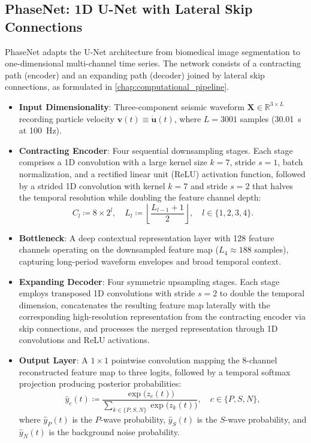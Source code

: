 \subsection{\ac{PhaseNet}: 1D U-Net with Lateral Skip Connections}
\label{subsec:phasenet_arch}

\ac{PhaseNet} adapts the U-Net architecture from biomedical image
segmentation to
one-dimensional multi-channel time series. The network consists of a
contracting
path (encoder) and an expanding path (decoder) joined by lateral
skip connections,
as formulated in \cref{chap:computational_pipeline}.

\begin{itemize}
  \item \textbf{Input Dimensionality}: Three-component seismic waveform
    $\mathbf{X} \in \mathbb{R}^{3 \times L}$ recording particle velocity
    $\mathbf{v}(t) \equiv \dot{\mathbf{u}}(t)$, where $L = \num{3001}$ samples
    (\qty{30.01}{\second} at \qty{100}{\hertz}).
  \item \textbf{Contracting Encoder}: Four sequential downsampling stages.
    Each stage comprises a 1D convolution with a large kernel size
    $k = \num{7}$,
    stride $s = \num{1}$, batch normalization, and a rectified
    linear unit (ReLU)
    activation function, followed by a strided 1D convolution with
    kernel $k = \num{7}$
    and stride $s = \num{2}$ that halves the temporal resolution
    while doubling the
    feature channel depth:
    \begin{equation}
      C_l \coloneqq \num{8} \times 2^l, \quad L_l \coloneqq
      \left\lfloor \frac{L_{l-1} +
      1}{2} \right\rfloor, \quad l \in \{1, 2, 3, 4\}.
    \end{equation}
  \item \textbf{Bottleneck}: A deep contextual representation layer
    with \num{128}
    feature channels operating on the downsampled feature map ($L_4
      \approx \num{188}$
    samples), capturing long-period waveform envelopes and broad
    temporal context.
  \item \textbf{Expanding Decoder}: Four symmetric upsampling stages. Each
    stage employs transposed 1D convolutions with stride $s =
    \num{2}$ to double the
    temporal dimension, concatenates the resulting feature map
    laterally with the
    corresponding high-resolution representation from the contracting encoder
    via skip connections, and processes the merged representation through 1D
    convolutions and ReLU activations.
  \item \textbf{Output Layer}: A $\num{1} \times \num{1}$ pointwise
    convolution mapping
    the 8-channel reconstructed feature map to three logits, followed by a
    temporal softmax projection producing posterior probabilities:
    \begin{equation}
      \hat{y}_{c}(t) \coloneqq \frac{\exp\bigl( z_c(t) \bigr)}{\sum_{k \in
      \{P, S, N\}} \exp\bigl( z_k(t) \bigr)}, \quad c \in \{P, S, N\},
      \label{eq:training_phasenet_softmax}
    \end{equation}
    where $\hat{y}_P(t)$ is the $P$-wave probability, $\hat{y}_S(t)$
    is the $S$-wave
    probability, and $\hat{y}_N(t)$ is the background noise probability.
\end{itemize}
